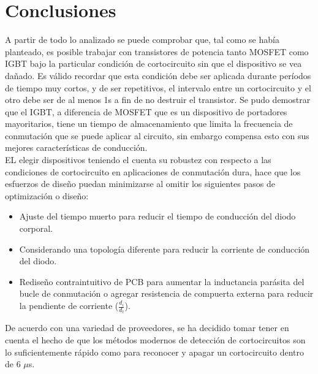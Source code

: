 \documentclass[conference]{IEEEtran}
\begin{document}
\section{Conclusiones}
A partir de todo lo analizado se puede comprobar que, tal como se había planteado, es posible trabajar con transistores de potencia tanto MOSFET como IGBT bajo la particular condición de cortocircuito sin que el dispositivo se vea dañado. Es válido recordar que esta condición debe ser aplicada durante períodos de tiempo muy cortos, y de ser repetitivos, el intervalo entre un cortocircuito y el otro debe ser de al menos 1s a fin de no destruir el transistor. Se pudo demostrar que el IGBT, a diferencia de MOSFET que es un dispositivo de portadores mayoritarios, tiene un tiempo de almacenamiento que limita la frecuencia de conmutación que se puede aplicar al circuito, sin embargo compensa esto con sus mejores características de conducción.\\

EL elegir dispositivos teniendo el cuenta su robustez con respecto a las condiciones de cortocircuito en aplicaciones de conmutación dura, hace que los esfuerzos de diseño puedan minimizarse al omitir los siguientes pasos de optimización o diseño:
\begin{itemize}
\item Ajuste del tiempo muerto para reducir el tiempo de conducción del diodo corporal.
\item Considerando una topología diferente para reducir la corriente de conducción del diodo.
\item Rediseño contraintuitivo de PCB para aumentar la inductancia parásita del bucle de conmutación o agregar resistencia de compuerta externa para reducir la pendiente de corriente ($\frac{d_i}{d_t}$).
\end{itemize}

De acuerdo con una variedad de proveedores, se ha decidido tomar tener en cuenta el hecho de que los métodos modernos de detección de cortocircuitos son lo suficientemente rápido como para reconocer y apagar un cortocircuito dentro de 6 $\mu$s\cite{six}. 

\vfill
\end{document}
